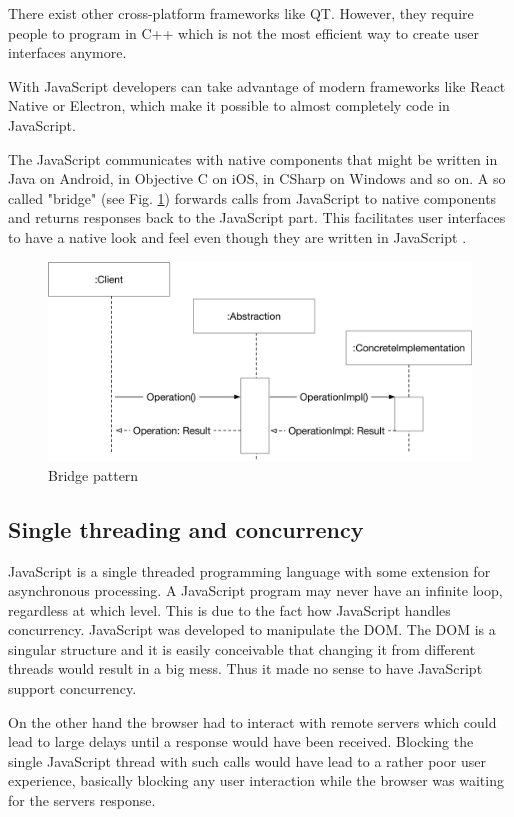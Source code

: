 There exist other cross-platform frameworks like QT. However, they require people to program in C++
which is not the most efficient way to create user interfaces anymore.


With JavaScript developers can take advantage of modern frameworks like React Native or Electron, which make it possible to almost completely code in JavaScript. 

The JavaScript communicates with native components that might be written in Java on
Android, in Objective C on iOS, in CSharp on Windows and so on. A so called "bridge"
(see Fig. \ref{fig:BP}) forwards calls from JavaScript to native components and returns
responses back to the JavaScript part. This facilitates user interfaces to 
have a native look and feel even though they are written in JavaScript \cite{Purewal2014LearningWeb}.

\begin{figure}[H]
	\centering
	\includegraphics[width=1.0\linewidth]{bilder/grundlagen/BridgePattern.png}
	\caption{Bridge pattern \cite{GOLL}}
	\label{fig:BP}
\end{figure}


\subsection{Single threading and concurrency}

JavaScript is a single threaded programming language with some extension for asynchronous processing.
A JavaScript program may never have an infinite loop, regardless at which level.
This is due to the fact how JavaScript handles concurrency. JavaScript was developed to manipulate the DOM. 
The DOM is a singular structure and it is easily conceivable that changing it from different threads would result in a big mess.
Thus it made no sense to have JavaScript support concurrency.

On the other hand the browser had to interact with remote servers 
which could lead to large delays until a response would have been received.
Blocking the single JavaScript thread with such calls would have lead to
a rather poor user experience, basically blocking 
any user interaction while the browser was waiting for
the servers response.

